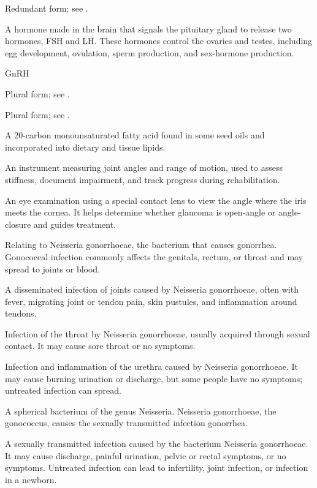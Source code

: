  Redundant form; see .

 A hormone made in the brain that signals the pituitary gland to release two hormones, FSH and LH. These hormones control the ovaries and testes, including egg development, ovulation, sperm production, and sex-hormone production.

\synonyms
GnRH

 Plural form; see .

 Plural form; see .

 A 20-carbon monounsaturated fatty acid found in some seed oils and incorporated into dietary and tissue lipids.

 An instrument measuring joint angles and range of motion, used to assess stiffness, document impairment, and track progress during rehabilitation.

 An eye examination using a special contact lens to view the angle where the iris meets the cornea. It helps determine whether glaucoma is open-angle or angle-closure and guides treatment.

 Relating to Neisseria gonorrhoeae, the bacterium that causes gonorrhea. Gonococcal infection commonly affects the genitals, rectum, or throat and may spread to joints or blood.

 A disseminated infection of joints caused by Neisseria gonorrhoeae, often with fever, migrating joint or tendon pain, skin pustules, and inflammation around tendons.

 Infection of the throat by Neisseria gonorrhoeae, usually acquired through sexual contact. It may
cause sore throat or no symptoms.

 Infection and inflammation of the urethra caused by Neisseria gonorrhoeae. It may cause burning urination or discharge, but some people have no symptoms; untreated infection can spread.

 A spherical bacterium of the genus Neisseria. Neisseria gonorrhoeae, the gonococcus, causes the sexually transmitted infection gonorrhea.

 A sexually transmitted infection caused by the bacterium Neisseria gonorrhoeae. It may cause discharge, painful urination, pelvic or rectal symptoms, or no symptoms. Untreated infection can lead to infertility, joint infection, or infection in a newborn.


